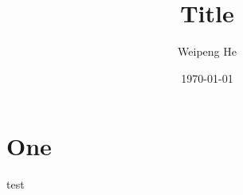\documentclass[12pt, a4]{article}
\title{Title}
\author{Weipeng He}
\date{\today}
\begin{document}
 
\maketitle
 
\section{One}
test
 
\end{document}
